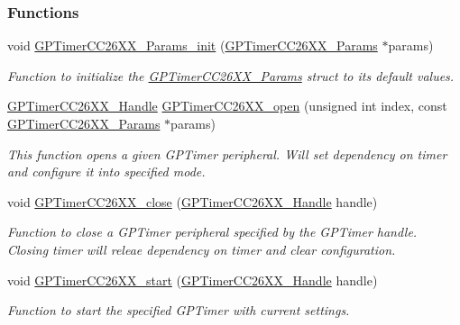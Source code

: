 \subsubsection*{Functions}
\begin{DoxyCompactItemize}
\item 
void \hyperlink{_g_p_timer_c_c26_x_x_8h_a11e9f3ff24f5f075989f89d99e65e827}{G\+P\+Timer\+C\+C26\+X\+X\+\_\+\+Params\+\_\+init} (\hyperlink{struct_g_p_timer_c_c26_x_x___params}{G\+P\+Timer\+C\+C26\+X\+X\+\_\+\+Params} $\ast$params)
\begin{DoxyCompactList}\small\item\em Function to initialize the \hyperlink{struct_g_p_timer_c_c26_x_x___params}{G\+P\+Timer\+C\+C26\+X\+X\+\_\+\+Params} struct to its default values. \end{DoxyCompactList}\item 
\hyperlink{_g_p_timer_c_c26_x_x_8h_ab85403dde5940c587c57ca1a140e655a}{G\+P\+Timer\+C\+C26\+X\+X\+\_\+\+Handle} \hyperlink{_g_p_timer_c_c26_x_x_8h_a30f6c028f0abea0b35c3be3d1609ea9b}{G\+P\+Timer\+C\+C26\+X\+X\+\_\+open} (unsigned int index, const \hyperlink{struct_g_p_timer_c_c26_x_x___params}{G\+P\+Timer\+C\+C26\+X\+X\+\_\+\+Params} $\ast$params)
\begin{DoxyCompactList}\small\item\em This function opens a given G\+P\+Timer peripheral. Will set dependency on timer and configure it into specified mode. \end{DoxyCompactList}\item 
void \hyperlink{_g_p_timer_c_c26_x_x_8h_a0a148f2232f5bb4c59015de965c82d43}{G\+P\+Timer\+C\+C26\+X\+X\+\_\+close} (\hyperlink{_g_p_timer_c_c26_x_x_8h_ab85403dde5940c587c57ca1a140e655a}{G\+P\+Timer\+C\+C26\+X\+X\+\_\+\+Handle} handle)
\begin{DoxyCompactList}\small\item\em Function to close a G\+P\+Timer peripheral specified by the G\+P\+Timer handle. Closing timer will releae dependency on timer and clear configuration. \end{DoxyCompactList}\item 
void \hyperlink{_g_p_timer_c_c26_x_x_8h_a869213ede8949245112fd7ca9c9ebdaa}{G\+P\+Timer\+C\+C26\+X\+X\+\_\+start} (\hyperlink{_g_p_timer_c_c26_x_x_8h_ab85403dde5940c587c57ca1a140e655a}{G\+P\+Timer\+C\+C26\+X\+X\+\_\+\+Handle} handle)
\begin{DoxyCompactList}\small\item\em Function to start the specified G\+P\+Timer with current settings. \end{DoxyCompactList}\item 

\end{DoxyCompactItemize}
